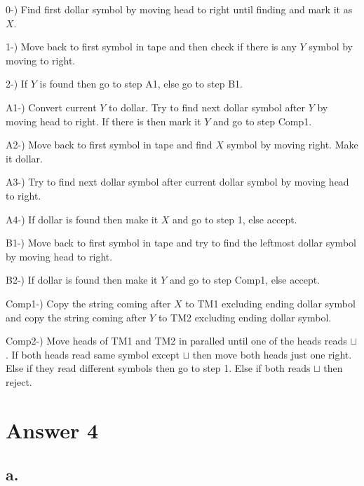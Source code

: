 \documentclass[12pt]{article}
\begin{document}
0-) Find first dollar symbol by moving head to right until finding and mark it as $X$.

1-) Move back to first symbol in tape and then check if there is any $Y$ symbol by moving 
to right.

2-) If $Y$ is found then go to step A1, else go to step B1.

A1-) Convert current $Y$ to dollar. Try to find next dollar symbol after $Y$ by moving 
head to right. If there is then mark it $Y$ and go to step Comp1.

A2-) Move back to first symbol in tape and find $X$ symbol by moving right. Make it 
dollar.

A3-) Try to find next dollar symbol after current dollar symbol by moving head to right.

A4-) If dollar is found then make it $X$ and go to step 1, else accept.

B1-) Move back to first symbol in tape and try to find the leftmost dollar symbol by 
moving head to right.

B2-) If dollar is found then make it $Y$ and go to step Comp1, else accept.

Comp1-) Copy the string coming after $X$ to TM1 excluding ending dollar symbol and 
copy the string coming after $Y$ to TM2 excluding ending dollar symbol.

Comp2-) Move heads of TM1 and TM2 in paralled until one of the heads reads $\sqcup$. 
If both heads read same symbol except $\sqcup$ then move both heads just one right.
Else if they read different symbols then go to step 1. Else if both reads $\sqcup$ then 
reject.

\section*{Answer 4}

\subsection*{a.}
\end{document}
